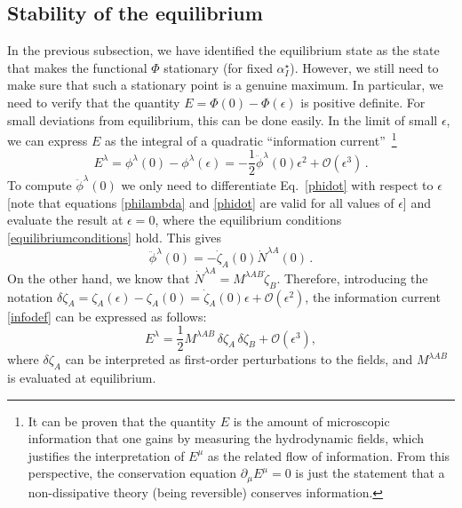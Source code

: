 \documentclass[12pt,aps,prd,nofootinbib,noshowkeys,noshowpacs,longbibliography,
superscriptaddress,tightenlines,floatfix,preprintnumbers]{revtex4-2}
\begin{document}
\subsection{Stability of the equilibrium}

In the previous subsection, we have identified the equilibrium state as the state that makes the functional $\Phi$ stationary (for fixed $\alpha^\star_I$). However, we still need to make sure that such a stationary point is a genuine maximum. In particular, we need to verify that the quantity $E=\Phi(0)-\Phi(\epsilon)$ is positive definite. For small deviations from equilibrium, this can be done easily. In the limit of small $\epsilon$, we can express $E$ as the integral of a quadratic ``information current''~\cite{GavassinoCausality2021}\footnote{\color{black} It can be proven \cite{GavassinoCausality2021} that the quantity $E$ is the amount of microscopic information that one gains by measuring the hydrodynamic fields, which justifies the interpretation of $E^\mu$ as the related flow of information. From this perspective, the conservation equation $\partial_\mu E^\mu=0$ is just the statement that a non-dissipative theory (being reversible) conserves information.}
\begin{equation}\label{infodef}
    E^\lambda = \phi^\lambda(0)-\phi^\lambda(\epsilon) = -\dfrac{1}{2} \ddot{\phi}^\lambda(0) \epsilon^2 + \mathcal{O}(\epsilon^3) \, .
\end{equation}
To compute $\ddot{\phi}^\lambda(0)$ we only need to differentiate Eq.~\eqref{phidot} with respect to $\epsilon$ [note that equations \eqref{philambda} and \eqref{phidot} are valid for all values of $\epsilon$] and evaluate the result at $\epsilon=0$, where the equilibrium conditions \eqref{equilibriumconditions} hold.
This gives 
\begin{equation}
\ddot{\phi}^\lambda(0)= -\dot{\zeta}_A(0) \dot{N}^{\lambda A}(0)\,.    
\end{equation}
On the other hand, we know that $\dot{N}^{\lambda A}= M^{\lambda A B}\dot{\zeta}_B$. Therefore, introducing the notation $\delta \zeta_A=\zeta_A(\epsilon)-\zeta_A(0)=\dot{\zeta}_A(0)\epsilon + \mathcal{O}(\epsilon^2)$, the information current \eqref{infodef} can be expressed as follows:
\begin{equation}\label{infoquadratic}
    E^\lambda = \dfrac{1}{2} M^{\lambda A B}\,\delta \zeta_A \,\delta \zeta_B + \mathcal{O}(\epsilon^3),
\end{equation}
where $\delta \zeta_A$ can be interpreted as first-order perturbations to the fields, and $M^{\lambda AB}$ is evaluated at equilibrium. 
\end{document}
